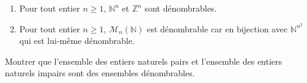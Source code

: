 \documentclass[french,11pt,twoside]{VcCours}
\begin{document}
\begin{Demonstration}{}

\vspace*{6cm}
\end{Demonstration}



\begin{Exemples}
\begin{enumerate}
\item Pour tout entier $n \geq 1$, $\mathbb{N}^n$ et $\mathbb{Z}^n$ sont dénombrables.
\item Pour tout entier $n \geq 1$, $\mathcal{M}_n(\mathbb{N})$ est dénombrable car en bijection avec $\mathbb{N}^{n^2}$ qui est lui-même dénombrable.
\end{enumerate}
\end{Exemples}

\begin{ApplicationDirecte}{} Montrer que l'ensemble des entiers naturels pairs et l'ensemble des entiers naturels impairs sont des ensembles dénombrables.
\end{ApplicationDirecte}
\end{document}
